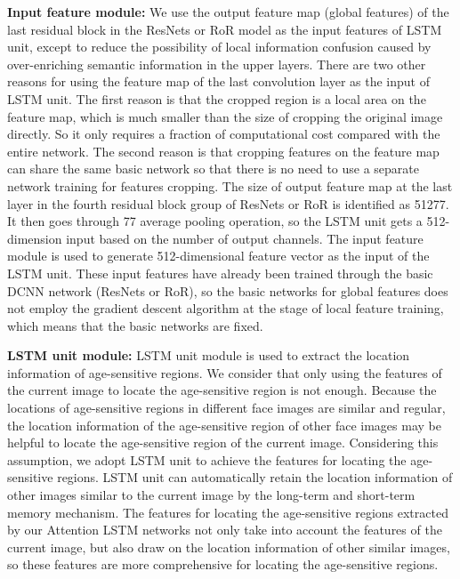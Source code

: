 \documentclass[journal]{IEEEtran}
\begin{document}
\par
\textbf{Input feature module:} We use the output feature map (global features) of the last residual block in the ResNets or RoR model as the input features of LSTM unit, except to reduce the possibility of local information confusion caused by over-enriching semantic information in the upper layers. There are two other reasons for using the feature map of the last convolution layer as the input of LSTM unit. The first reason is that the cropped region is a local area on the feature map, which is much smaller than the size of cropping the original image directly. So it only requires a fraction of computational cost compared with the entire network. The second reason is that cropping features on the feature map can share the same basic network so that there is no need to use a separate network training for features cropping. The size of output feature map at the last layer in the fourth residual block group of ResNets or RoR is identified as 51277. It then goes through 77 average pooling operation, so the LSTM unit gets a 512-dimension input based on the number of output channels. The input feature module is used to generate 512-dimensional feature vector as the input of the LSTM unit. These input features have already been trained through the basic DCNN network (ResNets or RoR), so the basic networks for global features does not employ the gradient descent algorithm at the stage of local feature training, which means that the basic networks are fixed.
\par
\textbf{LSTM unit module:} LSTM unit module is used to extract the location information of age-sensitive regions. We consider that only using the features of the current image to locate the age-sensitive region is not enough. Because the locations of age-sensitive regions in different face images are similar and regular, the location information of the age-sensitive region of other face images may be helpful to locate the age-sensitive region of the current image. Considering this assumption, we adopt LSTM unit to achieve the features for locating the age-sensitive regions. LSTM unit can automatically retain the location information of other images similar to the current image by the long-term and short-term memory mechanism. The features for locating the age-sensitive regions extracted by our Attention LSTM networks not only take into account the features of the current image, but also draw on the location information of other similar images, so these features are more comprehensive for locating the age-sensitive regions.
\end{document}
